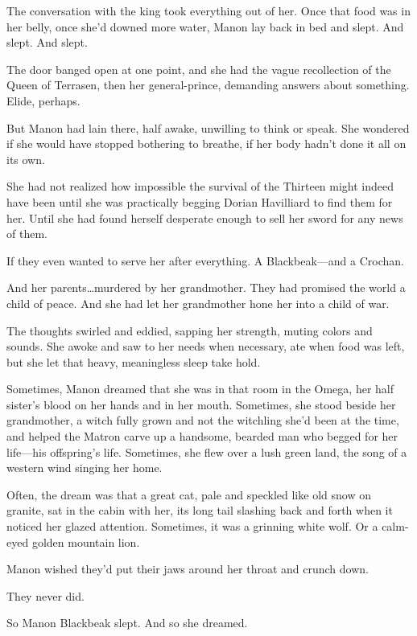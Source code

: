 The conversation with the king took everything out of her.
Once that food was in her belly, once she'd downed more water, Manon lay back in bed and slept.
And slept.
And slept.

The door banged open at one point, and she had the vague recollection of the Queen of Terrasen, then her general-prince, demanding answers about something.
Elide, perhaps.

But Manon had lain there, half awake, unwilling to think or speak.
She wondered if she would have stopped bothering to breathe, if her body hadn't done it all on its own.

She had not realized how impossible the survival of the Thirteen might indeed have been until she was practically begging Dorian Havilliard to find them for her.
Until she had found herself desperate enough to sell her sword for any news of them.

If they even wanted to serve her after everything.
A Blackbeak---and a Crochan.

And her parents\ldots murdered by her grandmother.
They had promised the world a child of peace.
And she had let her grandmother hone her into a child of war.

The thoughts swirled and eddied, sapping her strength, muting colors and sounds.
She awoke and saw to her needs when necessary, ate when food was left, but she let that heavy, meaningless sleep take hold.

Sometimes, Manon dreamed that she was in that room in the Omega, her half sister's blood on her hands and in her mouth.
Sometimes, she stood beside her grandmother, a witch fully grown and not the witchling she'd been at the time, and helped the Matron carve up a handsome, bearded man who begged for her life---his offspring's life.
Sometimes, she flew over a lush green land, the song of a western wind singing her home.

Often, the dream was that a great cat, pale and speckled like old snow on granite, sat in the cabin with her, its long tail slashing back and forth when it noticed her glazed attention.
Sometimes, it was a grinning white wolf.
Or a calm-eyed golden mountain lion.

Manon wished they'd put their jaws around her throat and crunch down.

They never did.

So Manon Blackbeak slept.
And so she dreamed.
